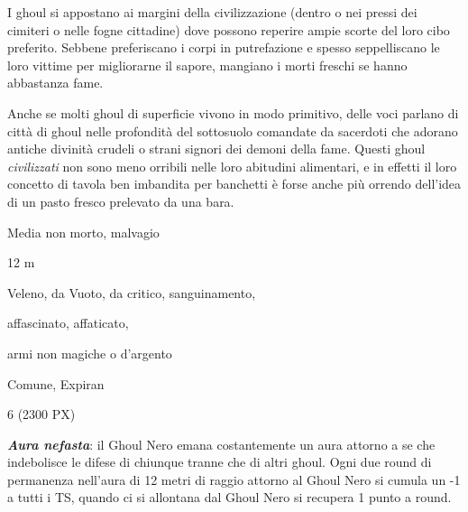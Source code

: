 \begin{multicols}{2}
{I ghoul si appostano ai margini della civilizzazione (dentro o nei pressi dei cimiteri o nelle fogne cittadine) dove possono reperire ampie scorte del loro cibo preferito. Sebbene preferiscano i corpi in putrefazione e spesso seppelliscano le loro vittime per migliorarne il sapore, mangiano i morti freschi se hanno abbastanza fame.

Anche se molti ghoul di superficie vivono in modo primitivo, delle voci parlano di città di ghoul nelle profondità del sottosuolo comandate da sacerdoti che adorano antiche divinità crudeli o strani signori dei demoni della fame. Questi ghoul \emph{civilizzati} non sono meno orribili nelle loro abitudini alimentari, e in effetti il loro concetto di tavola ben imbandita per banchetti è forse anche più orrendo dell'idea di un pasto fresco prelevato da una bara.

\begin{description}[noitemsep, topsep=0pt, parsep=0pt, partopsep=0pt, itemsep=1pt, leftmargin=2.35cm,  labelwidth=2.2cm, itemindent=0cm, listparindent=0pt] %
\setlength{\baselineskip}{10pt}
\item[\textbf{Taglia/Tipo}] Media non morto, malvagio
\item[\textbf{Caratt.}] 
\item[\textbf{Punti Ferita}] 
\item[\textbf{Movimento}] 12 m
\item[\textbf{Tiri Salvez.}] 
\item[\textbf{Imm. Danni}] Veleno, da Vuoto, da critico, sanguinamento,
\item[\textbf{Immunità}] affascinato, affaticato,
\item[\textbf{Res. Danni}] armi non magiche o d'argento
\item[\textbf{Sensi}] 
\item[\textbf{Linguaggi}] Comune, Expiran
\item[\textbf{Sfida}] 6 (2300 PX)
\end{description}
\smallskip

\textbf{\emph{Aura nefasta}}: il Ghoul Nero emana costantemente un aura attorno a se che indebolisce le difese di chiunque tranne che di altri ghoul. Ogni due round di permanenza nell'aura di 12 metri di raggio attorno al Ghoul Nero si cumula un -1 a tutti i TS, quando ci si allontana dal Ghoul Nero si recupera 1 punto a round.

}
\end{multicols}
